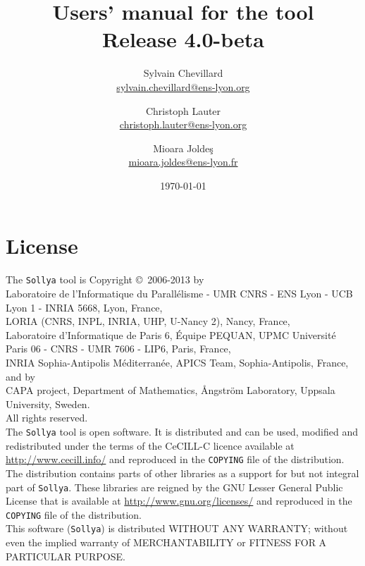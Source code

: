 \documentclass[a4paper]{article}
\title{Users' manual for the \sollya tool \\ {\large Release 4.0-beta}}
\author{Sylvain Chevillard \\ \small{\url{sylvain.chevillard@ens-lyon.org}} \and Christoph Lauter \\ \small{\url{christoph.lauter@ens-lyon.org}} \and Mioara Jolde\c{s} \\ \small{\url{mioara.joldes@ens-lyon.fr}} }
\date{\today}
\newcommand{\sollya}{\texttt{Sollya}\xspace}
\begin{document}
\maketitle

\section*{License}

The \sollya tool is Copyright \copyright~2006-2013 by \vspace{2mm} \\
\indent Laboratoire de
l'Informatique du Parall\'elisme - UMR CNRS - ENS Lyon - UCB Lyon 1 -
INRIA 5668, Lyon, France, \vspace{2mm} \\
\indent LORIA (CNRS, INPL, INRIA, UHP, U-Nancy 2), Nancy, France, \vspace{2mm} \\
\indent Laboratoire d'Informatique de Paris 6, \'Equipe PEQUAN,
UPMC Universit\'e Paris 06 - CNRS - UMR 7606 - LIP6, Paris, France,\vspace{2mm} \\
\indent INRIA Sophia-Antipolis M\'editerran\'ee, APICS Team, Sophia-Antipolis, France, \vspace{2mm} \\  and by \vspace{2mm} \\
\indent CAPA project, Department of Mathematics, Ångström Laboratory, Uppsala University, Sweden.\vspace{2mm} \\
All rights reserved.\\[0.2cm]

\noindent The \sollya tool is open software. It is distributed and can be used,
modified and redistributed under the terms of the CeCILL-C licence
available at \url{http://www.cecill.info/} and reproduced in the
\texttt{COPYING} file of the distribution. The distribution contains
parts of other libraries as a support for but not integral part of
\sollya. These libraries are reigned by the GNU Lesser General Public
License that is available at \url{http://www.gnu.org/licenses/} and
reproduced in the \texttt{COPYING} file of the distribution.\\[0.2cm]

\noindent This software (\sollya) is distributed WITHOUT ANY WARRANTY; without even the 
implied warranty of MERCHANTABILITY or FITNESS FOR A PARTICULAR PURPOSE.
\end{document}
